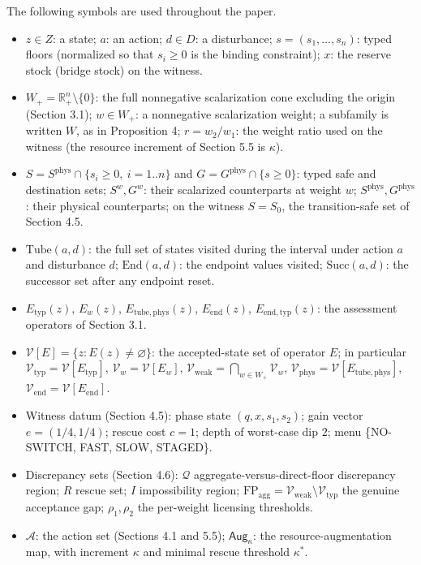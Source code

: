 \documentclass[review,11pt]{elsarticle}
\providecommand{\tightlist}{\setlength{\itemsep}{0pt}\setlength{\parskip}{0pt}}
\begin{document}
The following symbols are used throughout the paper.

\begin{itemize}
\tightlist
\item
  \(z \in Z\): a state; \(a\): an action; \(d \in D\): a disturbance; \(s = (s_1, \ldots, s_n)\): typed floors (normalized so that \(s_i \ge 0\) is the binding constraint); \(x\): the reserve stock (bridge stock) on the witness.
\item
  \(W_+ = \mathbb{R}^n_+ \setminus \{0\}\): the full nonnegative scalarization cone excluding the origin (Section 3.1); \(w \in W_+\): a nonnegative scalarization weight; a subfamily is written \(W\), as in Proposition 4; \(r = w_2 / w_1\): the weight ratio used on the witness (the resource increment of Section 5.5 is \(\kappa\)).
\item
  \(S = S^{\mathrm{phys}} \cap \{ s_i \ge 0,\ i = 1..n \}\) and \(G = G^{\mathrm{phys}} \cap \{ s \ge 0 \}\): typed safe and destination sets; \(S^w, G^w\): their scalarized counterparts at weight \(w\); \(S^{\mathrm{phys}}, G^{\mathrm{phys}}\): their physical counterparts; on the witness \(S = S_0\), the transition-safe set of Section 4.5.
\item
  \(\mathrm{Tube}(a,d)\): the full set of states visited during the interval under action \(a\) and disturbance \(d\); \(\mathrm{End}(a,d)\): the endpoint values visited; \(\mathrm{Succ}(a,d)\): the successor set after any endpoint reset.
\item
  \(E_{\mathrm{typ}}(z)\), \(E_w(z)\), \(E_{\mathrm{tube,phys}}(z)\), \(E_{\mathrm{end}}(z)\), \(E_{\mathrm{end,typ}}(z)\): the assessment operators of Section 3.1.
\item
  \(\mathcal{V}[E] = \{ z : E(z) \neq \varnothing \}\): the accepted-state set of operator \(E\); in particular \(\mathcal{V}_{\mathrm{typ}} = \mathcal{V}[E_{\mathrm{typ}}]\), \(\mathcal{V}_w = \mathcal{V}[E_w]\), \(\mathcal{V}_{\mathrm{weak}} = \bigcap_{w \in W_+} \mathcal{V}_w\), \(\mathcal{V}_{\mathrm{phys}} = \mathcal{V}[E_{\mathrm{tube,phys}}]\), \(\mathcal{V}_{\mathrm{end}} = \mathcal{V}[E_{\mathrm{end}}]\).
\item
  Witness datum (Section 4.5): phase state \((q, x, s_1, s_2)\); gain vector \(e = (1/4, 1/4)\); rescue cost \(c = 1\); depth of worst-case dip \(2\); menu \{NO-SWITCH, FAST, SLOW, STAGED\}.
\item
  Discrepancy sets (Section 4.6): \(\mathcal{Q}\) aggregate-versus-direct-floor discrepancy region; \(R\) rescue set; \(I\) impossibility region; \(\mathrm{FP}_{\mathrm{agg}} = \mathcal{V}_{\mathrm{weak}} \setminus \mathcal{V}_{\mathrm{typ}}\) the genuine acceptance gap; \(\rho_1, \rho_2\) the per-weight licensing thresholds.
\item
  \(\mathcal{A}\): the action set (Sections 4.1 and 5.5); \(\mathsf{Aug}_\kappa\): the resource-augmentation map, with increment \(\kappa\) and minimal rescue threshold \(\kappa^*\).
\end{itemize}
\end{document}
